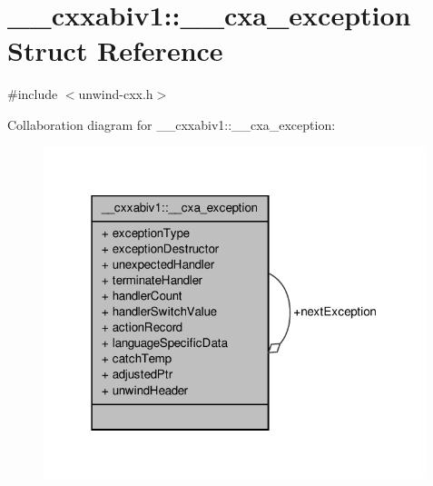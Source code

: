 \hypertarget{struct____cxxabiv1_1_1____cxa__exception}{\section{\-\_\-\-\_\-cxxabiv1\-:\-:\-\_\-\-\_\-cxa\-\_\-exception Struct Reference}
\label{struct____cxxabiv1_1_1____cxa__exception}
}


{\ttfamily \#include $<$unwind-\/cxx.\-h$>$}



Collaboration diagram for \-\_\-\-\_\-cxxabiv1\-:\-:\-\_\-\-\_\-cxa\-\_\-exception\-:\nopagebreak
\begin{figure}[H]
\begin{center}
\leavevmode
\includegraphics[width=316pt]{struct____cxxabiv1_1_1____cxa__exception__coll__graph}
\end{center}
\end{figure}
